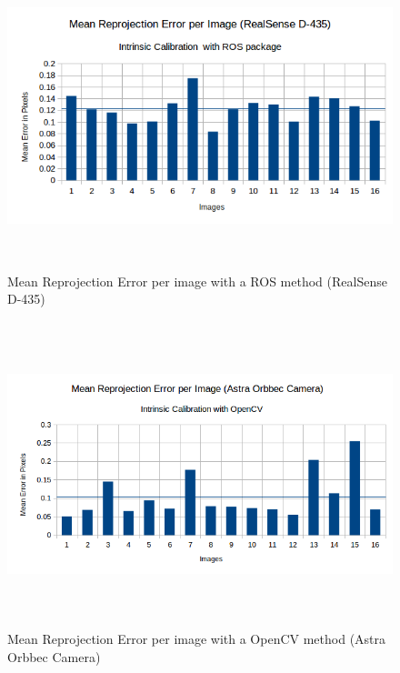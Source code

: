 \begin{figure}[!h]
\begin{center}
\includegraphics[width=5in, height=3.5in]{figures05/ros_int_cal_real.png}
\caption{Mean Reprojection Error per image with a ROS method (RealSense D-435)}%
\label{fig:realros}
\end{center}
\end{figure}

\begin{figure}[!h]
\begin{center}
\includegraphics[width=5in, height=3.5in]{figures05/opencv_int_cal_astra.png}
\caption{Mean Reprojection Error per image with a OpenCV method (Astra Orbbec Camera)}%
\label{fig:astraopen}
\end{center}
\end{figure}

